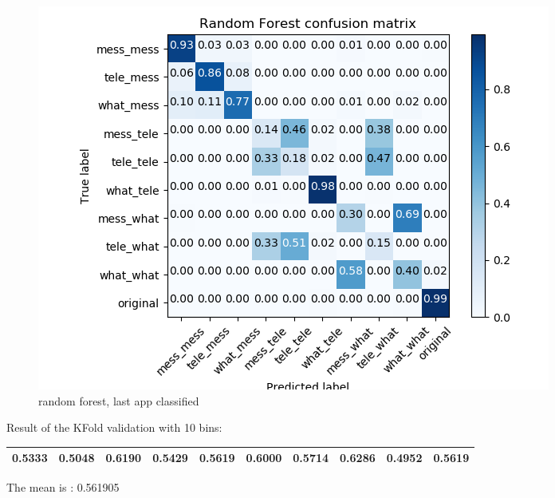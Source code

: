  \begin{figure}[H] 
\centering 
\includegraphics[scale=.6]{images/new_met_rf_initial_double_complete.png} 
\caption{random forest, last app classified} 
\end{figure} 


Result of the KFold validation with 10 bins:
 {\def\arraystretch{1.3} 
 \begin{table}[H] 
\centering 
\begin{tabular}{|l |l |l |l |l |l |l |l |l |l |}  
\hline 
0.5333&
0.5048&
0.6190&
0.5429&
0.5619&
0.6000&
0.5714&
0.6286&
0.4952&
0.5619\\ \hline  

\end{tabular} 
\end{table} }

The mean is : 0.561905